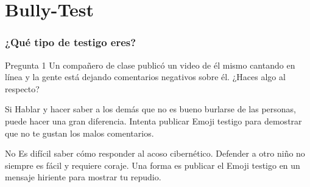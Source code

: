 \documentclass[12pt,spanish,x11names,svgnames]{beamer}
\begin{document}
\section{Bully-Test}
\begin{frame}[c]\frametitle{¿Qué tipo de testigo eres?}
  \begin{block}{Pregunta 1}
    Un compañero de clase publicó un video de él mismo cantando en línea y la
    gente está dejando comentarios negativos sobre él. ¿Haces algo al respecto?
  \end{block}
  \pause
  \begin{exampleblock}{Si}
    Hablar y hacer saber a los demás que no es bueno burlarse de las
    personas, puede hacer una gran diferencia. Intenta publicar Emoji️ testigo
    para demostrar que no te gustan los malos comentarios.
  \end{exampleblock}
  \pause
  \begin{alertblock}{No}
    Es difícil saber cómo responder al acoso cibernético. Defender a otro niño
    no siempre es fácil y requiere coraje. Una forma es publicar el Emoji
    testigo en un mensaje hiriente para mostrar tu repudio.
  \end{alertblock}
\end{frame}
\end{document}
